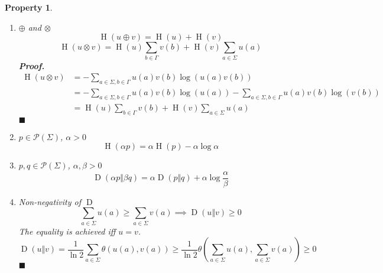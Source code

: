 \documentclass[aps,pra,onecolumn,notitlepage,superscriptaddress]{revtex4-1}
\newcommand{\spc}[1]{\mathcal{#1}}
\newcommand{\op}[1]{\operatorname{#1}}
\newtheorem{proper}{Property}
\def\Proof{{\bf Proof.~}}
\def\qed{$\blacksquare$ \newline}
\begin{document}
\begin{proper}
\begin{enumerate}
            \item $\oplus$ and $\otimes$
            \begin{equation}
                \op H(u \oplus v) = \op H(u) + \op H(v)
            \end{equation}
            \begin{equation}
                \op H(u \otimes v) = \op H(u) \sum_{b \in \Gamma} v(b) + \op H(v) \sum_{a \in \Sigma} u(a)
            \end{equation}
            \Proof
            \begin{align*}
                \op H(u \otimes v)
                &= -\sum_{a \in \Sigma, b \in \Gamma} u(a)v(b) \log (u(a)v(b)) \\
                &= -\sum_{a \in \Sigma, b \in \Gamma} u(a)v(b) \log (u(a)) - \sum_{a \in \Sigma, b \in \Gamma} u(a)v(b) \log (v(b)) \\
                &= \op H(u) \sum_{b \in \Gamma} v(b) + \op H(v) \sum_{a \in \Sigma} u(a)
            \end{align*}
            \qed

            \item $p \in \spc P(\Sigma)$, $\alpha > 0$
            \begin{equation}
                \op H(\alpha p) = \alpha \op H(p) - \alpha \log \alpha
            \end{equation}

            \item $p,q \in \spc P(\Sigma)$, $\alpha,\beta > 0$
            \begin{equation}
                \op D(\alpha p \Vert \beta q) = \alpha \op D(p \Vert q) + \alpha \log \frac{\alpha}{\beta}
            \end{equation}

            \item Non-negativity of $\op D$
            \begin{equation}
                \sum_{a \in \Sigma} u(a) \geq \sum_{a \in \Sigma} v(a)
                \implies \op D(u \Vert v) \geq 0
            \end{equation}
            The equality is achieved iff $u = v$.
            \newline\Proof
            \begin{equation}
                \op D(u \Vert v) = \frac{1}{\ln 2} \sum_{a \in \Sigma} \theta(u(a), v(a)) \geq \frac{1}{\ln 2} \theta(\sum_{a \in \Sigma} u(a), \sum_{a \in \Sigma} v(a)) \geq 0
            \end{equation}
            \qed


\end{enumerate}
\end{proper}
\end{document}
